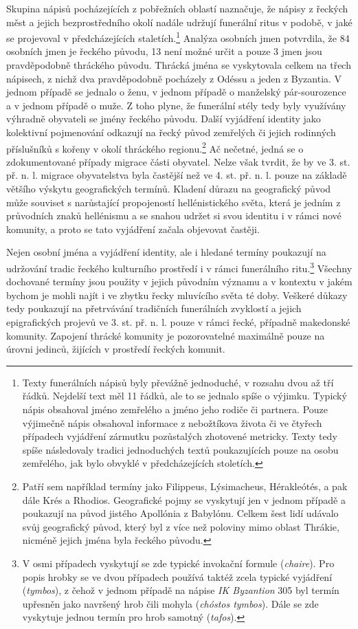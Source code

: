 Skupina nápisů pocházejících z pobřežních oblastí naznačuje, že nápisy z řeckých měst a jejich bezprostředního okolí nadále udržují funerální ritus v podobě, v jaké se projevoval v předcházejících staletích.\footnote{Texty funerálních nápisů byly převážně jednoduché, v rozsahu dvou až tří řádků. Nejdelší text měl 11 řádků, ale to se jednalo spíše o výjimku. Typický nápis obsahoval jméno zemřelého a jméno jeho rodiče či partnera. Pouze výjimečně nápis obsahoval informace z nebožtíkova života či ve čtyřech případech vyjádření zármutku pozůstalých zhotovené metricky. Texty tedy spíše následovaly tradici jednoduchých textů poukazujících pouze na osobu zemřelého, jak bylo obvyklé v předcházejících stoletích.} Analýza osobních jmen potvrdila, že 84  osobních jmen je řeckého původu, 13  není možné určit a pouze 3  jmen jsou pravděpodobně thráckého původu. Thrácká jména se vyskytovala celkem na třech nápisech, z nichž dva pravděpodobně pocházely z Odéssu a jeden z Byzantia. V jednom případě se jednalo o ženu, v jednom případě o manželský pár-sourozence a v jednom případě o muže. Z toho plyne, že funerální stély tedy byly využívány výhradně obyvateli se jmény řeckého původu. Další vyjádření identity jako kolektivní pojmenování odkazují na řecký původ zemřelých či jejich rodinných příslušníků s kořeny v okolí thráckého regionu.\footnote{Patří sem například termíny jako Filippeus, Lýsimacheus, Hérakleótés, a pak dále Krés a Rhodios. Geografické pojmy se vyskytují jen v jednom případě a poukazují na původ jistého Apollónia z Babylónu. Celkem šest lidí udávalo svůj geografický původ, který byl z více než poloviny mimo oblast Thrákie, nicméně jejich jména byla řeckého původu.} Ač nečetné, jedná se o zdokumentované případy migrace části obyvatel. Nelze však tvrdit, že by ve 3. st. př. n. l. migrace obyvatelstva byla častější než ve 4. st. př. n. l. pouze na základě většího výskytu geografických termínů. Kladení důrazu na geografický původ může souviset s narůstající propojeností hellénistického světa, která je jedním z průvodních znaků hellénismu a se snahou udržet si svou identitu i v rámci nové komunity, a proto se tato vyjádření začala objevovat častěji.

Nejen osobní jména a vyjádření identity, ale i hledané termíny poukazují na udržování tradic řeckého kulturního prostředí i v rámci funerálního ritu.\footnote{V osmi případech vyskytují se zde typické invokační formule ({\em chaire}). Pro popis hrobky se ve dvou případech používá taktéž zcela typické vyjádření ({\em tymbos}), z čehož v jednom případě na nápise {\em IK Byzantion} 305 byl termín upřesněn jako navršený hrob čili mohyla ({\em chóstos tymbos}). Dále se zde vyskytuje jednou termín pro hrob samotný ({\em tafos}).} Všechny dochované termíny jsou použity v jejich původním významu a v kontextu v jakém bychom je mohli najít i ve zbytku řecky mluvícího světa té doby. Veškeré důkazy tedy poukazují na přetrvávání tradičních funerálních zvyklostí a jejich epigrafických projevů ve 3. st. př. n. l. pouze v rámci řecké, případně makedonské komunity. Zapojení thrácké komunity je pozorovatelné maximálně pouze na úrovni jedinců, žijících v prostředí řeckých komunit.

